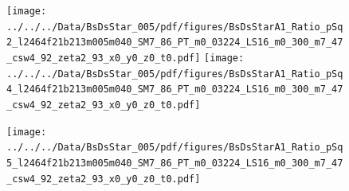 \documentclass[a4paper,10pt]{article}
\begin{document}
\clearpage
\begin{figure}[p]
 \texttt{[image: ../../../Data/BsDsStar\_005/pdf/figures/BsDsStarA1\_Ratio\_pSq2\_l2464f21b213m005m040\_SM7\_86\_PT\_m0\_03224\_LS16\_m0\_300\_m7\_47\_csw4\_92\_zeta2\_93\_x0\_y0\_z0\_t0.pdf]} 
 \texttt{[image: ../../../Data/BsDsStar\_005/pdf/figures/BsDsStarA1\_Ratio\_pSq4\_l2464f21b213m005m040\_SM7\_86\_PT\_m0\_03224\_LS16\_m0\_300\_m7\_47\_csw4\_92\_zeta2\_93\_x0\_y0\_z0\_t0.pdf]} 
 \end{figure}
\begin{figure}[p]
 \texttt{[image: ../../../Data/BsDsStar\_005/pdf/figures/BsDsStarA1\_Ratio\_pSq5\_l2464f21b213m005m040\_SM7\_86\_PT\_m0\_03224\_LS16\_m0\_300\_m7\_47\_csw4\_92\_zeta2\_93\_x0\_y0\_z0\_t0.pdf]} 
 \end{figure}
\clearpage
\end{document}
